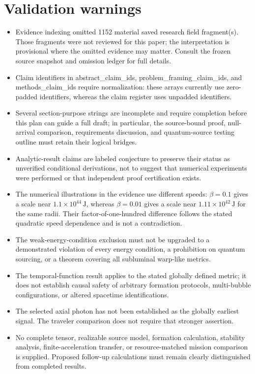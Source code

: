 \documentclass[11pt]{article}
\begin{document}
\section*{Validation warnings}
\begin{itemize}
\item Evidence indexing omitted 1152 material saved research field fragment(s). Those fragments were not reviewed for this paper; the interpretation is provisional where the omitted evidence may matter. Consult the frozen source snapshot and omission ledger for full details.
\item Claim identifiers in abstract\_claim\_ids, problem\_framing\_claim\_ids, and methods\_claim\_ids require normalization: these arrays currently use zero-padded identifiers, whereas the claim register uses unpadded identifiers.
\item Several section-purpose strings are incomplete and require completion before this plan can guide a full draft; in particular, the source-bound proof, null-arrival comparison, requirements discussion, and quantum-source testing outline must retain their logical bridges.
\item Analytic-result claims are labeled conjecture to preserve their status as unverified conditional derivations, not to suggest that numerical experiments were performed or that independent proof certification exists.
\item The numerical illustrations in the evidence use different speeds: $\beta=0.1$ gives a scale near $1.1\times10^{44}\,\mathrm{J}$, whereas $\beta=0.01$ gives a scale near $1.11\times10^{42}\,\mathrm{J}$ for the same radii. Their factor-of-one-hundred difference follows the stated quadratic speed dependence and is not a contradiction.
\item The weak-energy-condition exclusion must not be upgraded to a demonstrated violation of every energy condition, a prohibition on quantum sourcing, or a theorem covering all subluminal warp-like metrics.
\item The temporal-function result applies to the stated globally defined metric; it does not establish causal safety of arbitrary formation protocols, multi-bubble configurations, or altered spacetime identifications.
\item The selected axial photon has not been established as the globally earliest signal. The traveler comparison does not require that stronger assertion.
\item No complete tensor, realizable source model, formation calculation, stability analysis, finite-acceleration transfer, or resource-matched mission comparison is supplied. Proposed follow-up calculations must remain clearly distinguished from completed results.

\end{itemize}
\end{document}
